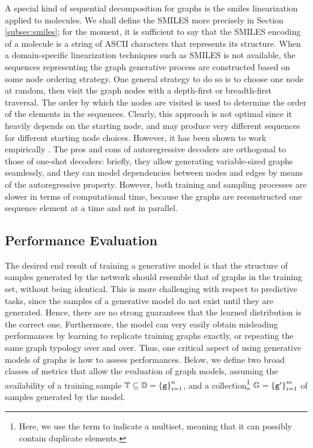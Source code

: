A special kind of sequential decomposition for graphs is the \gls{smiles} linearization applied to molecules. We shall define the SMILES more precisely in Section \ref{subsec:smiles}; for the moment, it is sufficient to say that the SMILES encoding of a molecule is a string of ASCII characters that represents its structure. When a domain-specific linearization techniques such as SMILES is not available, the sequences representing the graph generative process are constructed based on some node ordering strategy. One general strategy to do so is to choose one node at random, then visit the graph nodes with a depth-first or breadth-first traversal. The order by which the nodes are visited is used to determine the order of the elements in the sequences. Clearly, this approach is not optimal since it heavily depends on the starting node, and may produce very different sequences for different starting node choices. However, it has been shown to work empirically \citep{you2018graphrnn,li2018learningdeepgmg,bacciu2019edgegraphgenrnn,goyal2020graphgen}. The pros and cons of autoregressive decoders are orthogonal to those of one-shot decoders: briefly, they allow generating variable-sized graphs seamlessly, and they can model dependencies between nodes and edges by means of the autoregressive property. However, both training and sampling processes are slower in terms of computational time, because the graphs are reconstructed one sequence element at a time and not in parallel.

\subsection{Performance Evaluation}\label{sec:evaluation-generative-graphs}
The desired end result of training a generative model is that the structure of samples generated by the network should resemble that of graphs in the training set, without being identical. This is more challenging with respect to predictive tasks, since the samples of a generative model do not exist until they are generated. Hence, there are no strong guarantees that the learned distribution is the correct one. Furthermore, the model can very easily obtain misleading performances by learning to replicate training graphs exactly, or repeating the same graph typology over and over. Thus, one critical aspect of using generative models of graphs is how to assess performances. Below, we define two broad classes of metrics that allow the evaluation of graph models, assuming the availability of a training sample $\mathbb{T} \subseteq \mathbb{D} = \left\{ \mathtt{g} \right\}_{i=1}^n$, and a collection\footnote{Here, we use the term  to indicate a multiset, meaning that it can possibly contain duplicate elements.} $\mathbb{G} = \left\{ \mathtt{g'} \right\}_{i=1}^m$ of samples generated by the model.

